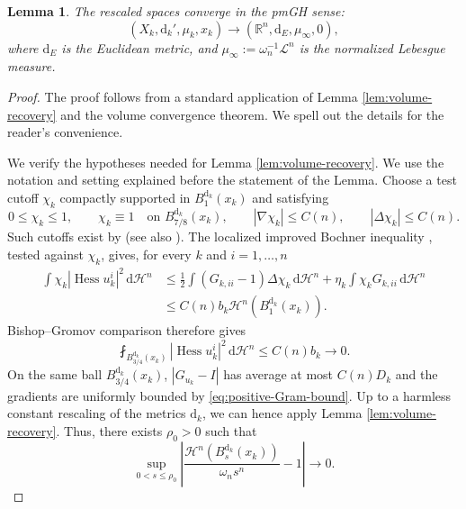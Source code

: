 \documentclass[12pt,a4paper,reqno]{amsart}
\newtheorem{lemma}[theorem]{Lemma}
\renewcommand{\leq}{\leqslant}
\newcommand{\Hn}{\mathcal H^n}
\newcommand{\Hess}{\operatorname{Hess}}
\begin{document}
\begin{lemma}
    The rescaled spaces converge in the pmGH sense:
    \[ (X_k, \mathrm{d}_k', \mu_k, x_k) \to (\mathbb{R}^n, \mathrm{d}_E, \mu_\infty, 0), \]
    where $\mathrm{d}_E$ is the Euclidean metric, and $\mu_\infty := \omega_n^{-1}\mathcal{L}^n$ is the normalized Lebesgue measure. 
\end{lemma}
\begin{proof}
The proof follows from a standard application of Lemma \ref{lem:volume-recovery} and the volume convergence theorem. We spell out the details for the reader's convenience. 

We verify the hypotheses needed for
Lemma \ref{lem:volume-recovery}. We use the notation and setting explained before the statement of the Lemma. Choose a test cutoff $\chi_k$ compactly supported in $B_1^{\mathrm{d}_k}(x_k)$ and
satisfying
\[
 0\leq \chi_k\leq 1,\qquad
 \chi_k\equiv 1\quad\text{on }B_{7/8}^{\mathrm{d}_k}(x_k),\qquad
 |\nabla\chi_k|\leq C(n),\qquad
 |\Delta\chi_k|\leq C(n).
\]
Such cutoffs exist by \cite[Proposition~2.13]{GigliViolo} (see also
\cite[Lemma~3.1]{MondinoNaber}).  The localized improved Bochner
inequality \cite[Proposition~2.14]{GigliViolo}, tested against $\chi_k$, gives, for every $k$ and $i=1,\ldots,n$
\begin{align*}
 \int\chi_k|\Hess u_k^i|^2\,\mathrm{d}\Hn
 &\leq
 \frac12\int(G_{k,ii}-1)\Delta\chi_k\,\mathrm{d}\Hn
 +\eta_k\int\chi_kG_{k,ii}\,\mathrm{d}\Hn\\
 &\leq C(n)b_k\Hn(B_1^{\mathrm{d}_k}(x_k)).
\end{align*}
Bishop--Gromov
comparison therefore gives
\begin{equation}\label{eq:hessian-smallness-fixed-ball}
 \fint_{B_{3/4}^{\mathrm{d}_k}(x_k)}
 |\Hess u_k^i|^2\,\mathrm{d}\Hn
 \leq C(n)b_k\to 0.
\end{equation}
On the same ball $B_{3/4}^{\mathrm{d}_k}(x_k)$, $|G_{u_k}-I|$ has average at most $C(n)D_k$ and the
gradients are uniformly bounded by \eqref{eq:positive-Gram-bound}. 
Up to a harmless constant rescaling of the metrics $\mathrm{d}_k$, we can hence apply Lemma \ref{lem:volume-recovery}. Thus, there exists $\rho_0>0$ such that 
\begin{equation}\label{eq:volume-recovery-original}
 \sup_{0<s\leq\rho_0}
 \left|\frac{\Hn(B_s^{\mathrm{d}_k}(x_k))}{\omega_ns^n}-1\right|\to 0.
\end{equation}


\end{proof}
\end{document}
